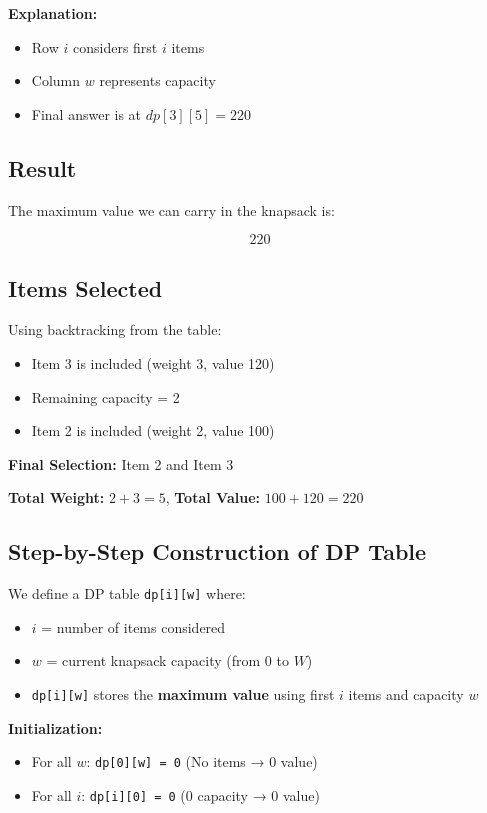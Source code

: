 \documentclass[14pt]{extarticle}
\begin{document}
\textbf{Explanation:}
\begin{itemize}
    \item Row $i$ considers first $i$ items
    \item Column $w$ represents capacity
    \item Final answer is at $dp[3][5] = \boxed{220}$
\end{itemize}

\subsection*{Result}

The maximum value we can carry in the knapsack is:

\[
\boxed{220}
\]

\subsection*{Items Selected}

Using backtracking from the table:
\begin{itemize}
    \item Item 3 is included (weight 3, value 120)
    \item Remaining capacity = 2
    \item Item 2 is included (weight 2, value 100)
\end{itemize}

\textbf{Final Selection:} Item 2 and Item 3

\textbf{Total Weight:} $2 + 3 = 5$, \textbf{Total Value:} $100 + 120 = \boxed{220}$

\subsection{Step-by-Step Construction of DP Table}

We define a DP table \texttt{dp[i][w]} where:
\begin{itemize}
    \item $i$ = number of items considered
    \item $w$ = current knapsack capacity (from $0$ to $W$)
    \item \texttt{dp[i][w]} stores the \textbf{maximum value} using first $i$ items and capacity $w$
\end{itemize}

\textbf{Initialization:}

\begin{itemize}
    \item For all $w$: \quad \texttt{dp[0][w] = 0} \quad (No items → 0 value)
    \item For all $i$: \quad \texttt{dp[i][0] = 0} \quad (0 capacity → 0 value)
\end{itemize}
\end{document}
